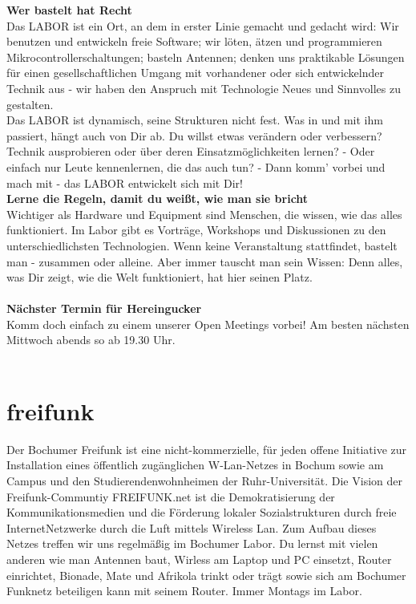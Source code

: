\documentclass[10pt,landscape,a4paper]{article}
\begin{document}
\begin{multicols}{3}
{\bf Wer bastelt hat Recht}\\
Das LABOR ist ein Ort, an dem in erster Linie gemacht und gedacht wird:
Wir benutzen und entwickeln freie Software; wir l\"oten, \"atzen und
programmieren Mikrocontrollerschaltungen; basteln Antennen; denken uns
praktikable L\"osungen f\"ur einen gesellschaftlichen Umgang mit vorhandener
oder sich entwickelnder Technik aus - wir haben den Anspruch mit Technologie
Neues und Sinnvolles zu gestalten.\\
Das LABOR ist dynamisch, seine Strukturen nicht fest. Was in und mit
ihm passiert, h\"angt auch von Dir ab. Du willst etwas ver\"andern oder
verbessern? Technik ausprobieren oder \"uber deren Einsatzm\"oglichkeiten
lernen? - Oder einfach nur Leute kennenlernen, die das auch tun? - Dann
komm' vorbei und mach mit - das LABOR entwickelt sich mit Dir!\\
{\bf Lerne die Regeln, damit du weißt, wie man sie bricht}\\
Wichtiger als Hardware und Equipment sind Menschen, die wissen, wie das alles
funktioniert. Im Labor gibt es Vortr\"age, Workshops und Diskussionen zu
den unterschiedlichsten Technologien. Wenn keine Veranstaltung stattﬁndet,
bastelt man - zusammen oder alleine. Aber immer tauscht man sein Wissen: Denn
alles, was Dir zeigt, wie die Welt funktioniert, hat hier seinen Platz.\\
\\
{\bf N\"achster Termin f\"ur Hereingucker}\\
Komm doch einfach zu einem unserer Open Meetings vorbei! Am besten n\"achsten
Mittwoch abends so ab 19.30 Uhr.\\
\\
\section{freifunk}
Der Bochumer Freifunk ist eine nicht-kommerzielle, für jeden
offene Initiative zur Installation eines öffentlich zugänglichen
W-Lan-Netzes in Bochum sowie am Campus und den Studierendenwohnheimen
der Ruhr-Universität. Die Vision der Freifunk-Communtiy FREIFUNK.net ist
die Demokratisierung der Kommunikationsmedien und die Förderung lokaler
Sozialstrukturen durch freie InternetNetzwerke durch die Luft mittels
Wireless Lan. Zum Aufbau dieses Netzes treffen wir uns regelmäßig
im Bochumer Labor. Du lernst mit vielen anderen wie man Antennen baut,
Wirless am Laptop und PC einsetzt, Router einrichtet, Bionade, Mate und
Afrikola trinkt oder trägt sowie sich am Bochumer Funknetz beteiligen
kann mit seinem Router. Immer Montags im Labor.\\




\end{multicols}
\end{document}
